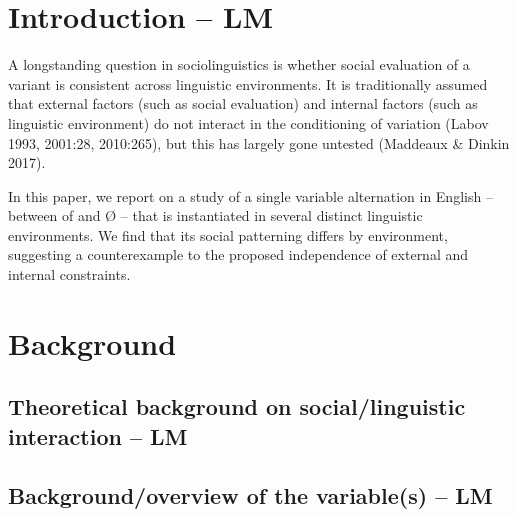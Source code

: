 \section{Introduction -- LM}

A longstanding question in sociolinguistics is whether social evaluation of a variant is consistent across linguistic environments. It is traditionally assumed that external factors (such as social evaluation) and internal factors (such as linguistic environment) do not interact in the conditioning of variation (Labov 1993, 2001:28, 2010:265), but this has largely gone untested (Maddeaux \& Dinkin 2017).

In this paper, we report on a study of a single variable alternation in English -- between of and Ø -- that is instantiated in several distinct linguistic environments. We find that its social patterning differs by environment, suggesting a counterexample to the proposed independence of external and internal constraints.

\section{Background}

\subsection{Theoretical background on social/linguistic interaction -- LM}
\subsection{Background/overview of the variable(s) -- LM}